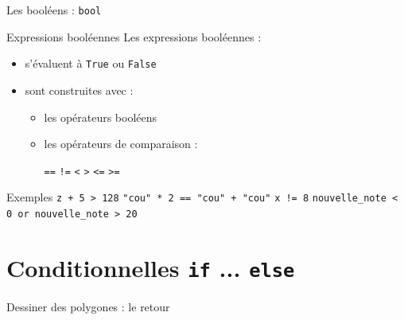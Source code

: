 \documentclass{beamer}
\begin{document}
\begin{frame}{Les booléens : \texttt{bool}}
  \begin{block}{Expressions booléennes}
    \vspace{0pt}
    Les expressions booléennes :
    \begin{itemize}
    \item s'évaluent à \texttt{True} ou \texttt{False}
    \item sont construites avec :
      \begin{itemize}
      \item les opérateurs booléens
        \pause
      \item les opérateurs de comparaison :

    \qquad \texttt{==}
    \qquad \texttt{!=}
    \qquad \texttt{<}
    \qquad \texttt{>}
    \qquad \texttt{<=}
    \qquad \texttt{>=}
      \end{itemize}
    \end{itemize}

  \begin{exampleblock}{Exemples}
    \vspace{0pt}
        \texttt{z + 5 > 128}
        \qquad \texttt{"cou" * 2 == "cou" + "cou"}
        \qquad \texttt{x != 8}
        \qquad \texttt{nouvelle_note < 0 or nouvelle_note > 20}
  \end{exampleblock}
  \end{block}
\end{frame}

\section{Conditionnelles \texttt{if} ... \texttt{else}}

\begin{frame}{Dessiner des polygones : le retour}

\pause

\bigskip

\end{frame}
\end{document}
